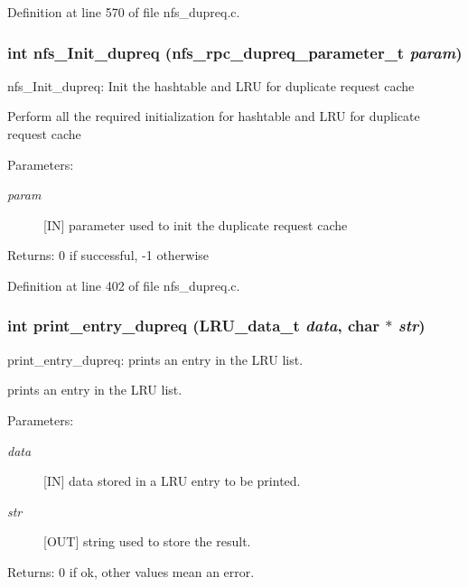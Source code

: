 Definition at line 570 of file nfs\_\-dupreq.c.
\subsubsection[{nfs\_\-Init\_\-dupreq}]{\setlength{\rightskip}{0pt plus 5cm}int nfs\_\-Init\_\-dupreq (nfs\_\-rpc\_\-dupreq\_\-parameter\_\-t {\em param})}\label{nfs__dupreq_8c_0e0c7a1fda2f7d756dd1b2f8b4f97db6}


nfs\_\-Init\_\-dupreq: Init the hashtable and LRU for duplicate request cache

Perform all the required initialization for hashtable and LRU for duplicate request cache

\begin{Desc}
\item[Parameters:]
\begin{description}
\item[{\em param}][IN] parameter used to init the duplicate request cache\end{description}
\end{Desc}
\begin{Desc}
\item[Returns:]0 if successful, -1 otherwise \end{Desc}


Definition at line 402 of file nfs\_\-dupreq.c.
\subsubsection[{print\_\-entry\_\-dupreq}]{\setlength{\rightskip}{0pt plus 5cm}int print\_\-entry\_\-dupreq (LRU\_\-data\_\-t {\em data}, \/  char $\ast$ {\em str})}\label{nfs__dupreq_8c_f812dda060fd0aa4f965adadb15dd22d}


print\_\-entry\_\-dupreq: prints an entry in the LRU list.

prints an entry in the LRU list.

\begin{Desc}
\item[Parameters:]
\begin{description}
\item[{\em data}][IN] data stored in a LRU entry to be printed. \item[{\em str}][OUT] string used to store the result.\end{description}
\end{Desc}
\begin{Desc}
\item[Returns:]0 if ok, other values mean an error. \end{Desc}


